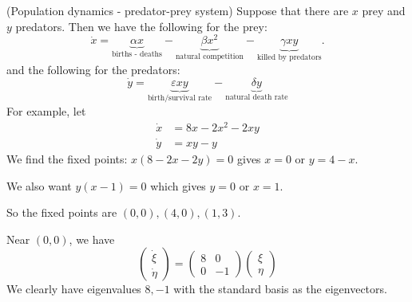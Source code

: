 \documentclass[a4paper]{article}
\begin{document}
\begin{eg}
  (Population dynamics - predator-prey system) Suppose that there are $x$ prey and $y$ predators. Then we have the following for the prey:
  \[
    \dot x = \underbrace{\alpha x}_{\text{births - deaths}} - \underbrace{\beta x^2}_{\text{natural competition}} - \underbrace{\gamma xy}_{\text{killed by predators}}.
  \]
  and the following for the predators:
  \[
    \dot y = \underbrace{\varepsilon xy}_{\text{birth/survival rate}} - \underbrace{\delta y}_{\text{natural death rate}}
  \]
  For example, let
  \begin{align*}
    \dot x &= 8x - 2x^2 - 2xy\\
    \dot y &= xy - y
  \end{align*}
  We find the fixed points: $x(8 - 2x - 2y) = 0$ gives $x = 0$ or $y = 4 - x$.

  We also want $y(x - 1) = 0$ which gives $y = 0$ or $x = 1$.

  So the fixed points are $(0, 0), (4, 0), (1, 3)$.

  Near $(0, 0)$, we have
  \[
    \begin{pmatrix}
      \dot \xi\\\dot \eta
    \end{pmatrix}=
    \begin{pmatrix}
      8 & 0\\
      0 & -1
    \end{pmatrix}
    \begin{pmatrix}
      \xi\\
      \eta
    \end{pmatrix}
  \]
  We clearly have eigenvalues $8, -1$ with the standard basis as the eigenvectors.
  \begin{center}
\end{center}
\end{eg}
\end{document}
